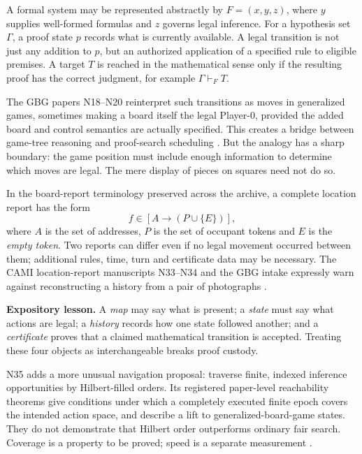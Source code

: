 \documentclass[11pt,letterpaper,oneside]{article}
\begin{document}
A formal system may be represented abstractly by $F=(x,y,z)$, where $y$ supplies well-formed formulas and $z$ governs legal inference. For a hypothesis set $\Gamma$, a proof state $p$ records what is currently available. A legal transition is not just any addition to $p$, but an authorized application of a specified rule to eligible premises. A target $T$ is reached in the mathematical sense only if the resulting proof has the correct judgment, for example $\Gamma\vdash_F T$.

The GBG papers N18--N20 reinterpret such transitions as moves in generalized games, sometimes making a board itself the legal Player-0, provided the added board and control semantics are actually specified. This creates a bridge between game-tree reasoning and proof-search scheduling \cite{gbg}. But the analogy has a sharp boundary: the game position must include enough information to determine which moves are legal. The mere display of pieces on squares need not do so.

In the board-report terminology preserved across the archive, a complete location report has the form
\[
 f\in[A\longrightarrow(P\cup\{E\})],
\]
where $A$ is the set of addresses, $P$ is the set of occupant tokens and $E$ is the \emph{empty token}. Two reports can differ even if no legal movement occurred between them; additional rules, time, turn and certificate data may be necessary. The CAMI location-report manuscripts N33--N34 and the GBG intake expressly warn against reconstructing a history from a pair of photographs \cite{akm,gbg}.

\begin{mathresult}
\textbf{Expository lesson.} A \emph{map} may say what is present; a \emph{state} must say what actions are legal; a \emph{history} records how one state followed another; and a \emph{certificate} proves that a claimed mathematical transition is accepted. Treating these four objects as interchangeable breaks proof custody.
\end{mathresult}

N35 adds a more unusual navigation proposal: traverse finite, indexed inference opportunities by Hilbert-filled orders. Its registered paper-level reachability theorems give conditions under which a completely executed finite epoch covers the intended action space, and describe a lift to generalized-board-game states. They do not demonstrate that Hilbert order outperforms ordinary fair search. Coverage is a property to be proved; speed is a separate measurement \cite{n35}.
\end{document}
